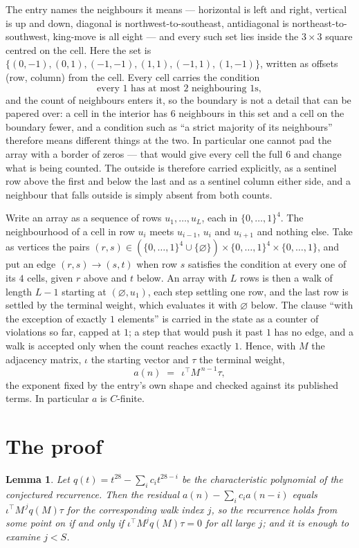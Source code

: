 \documentclass[11pt,a4paper]{article}
\theoremstyle{plain}
\newtheorem{lemma}[theorem]{Lemma}
\theoremstyle{definition}
\begin{document}
The entry names the neighbours it means --- horizontal is left and right, vertical is up and
down, diagonal is northwest-to-southeast, antidiagonal is northeast-to-southwest, king-move is
all eight --- and every such set lies inside the $3\times3$ square centred on the cell. Here
the set is $\{(0,-1), (0,1), (-1,-1), (1,1), (-1,1), (1,-1)\}$, written as offsets (row, column) from the cell. Every cell carries
the condition
\[
\text{every 1 has at most 2 neighbouring 1s},
\]
and the count of neighbours enters it, so the boundary is not a detail that can be papered
over: a cell in the interior has $6$ neighbours in this set and a cell on the boundary
fewer, and a condition such as ``a strict majority of its neighbours'' therefore means
different things at the two. In particular one cannot pad the array with a border of zeros ---
that would give every cell the full $6$ and change what is being counted. The outside is
therefore carried
explicitly, as a sentinel row above the first and below the last and as a sentinel column
either side, and a neighbour that falls outside is simply absent from both counts.

Write an array as a sequence of rows $u_1,\dots,u_L$, each in
$\{0,\dots,1\}^{4}$. The neighbourhood of a cell in row $u_i$ meets $u_{i-1}$,
$u_i$ and $u_{i+1}$ and nothing else. Take as vertices the pairs
$(r,s)\in(\{0,\dots,1\}^{4}\cup\{\varnothing\})\times\{0,\dots,1\}^{4} \times \{0,\dots,1\}$,
and put an edge $(r,s)\to(s,t)$ when row $s$ satisfies the condition at every one of its
$4$ cells, given $r$ above and $t$ below. An array with $L$ rows is then a walk of length
$L-1$ starting at $(\varnothing,u_1)$, each step settling one row, and the last row is
settled by the terminal weight, which evaluates it with $\varnothing$ below. The clause ``with the exception of exactly $1$ elements'' is carried in
the state as a counter of violations so far, capped at $1$; a step that would push it past
$1$ has no edge, and a walk is accepted only when the count reaches exactly $1$. Hence,
with $M$ the adjacency matrix, $\iota$ the starting vector and $\tau$ the terminal weight,
\[
a(n)\;=\;\,\iota^{\!\top}M^{\,n-1}\tau ,
\]
the exponent fixed by the entry's own shape and checked against its published terms. In
particular $a$ is $C$-finite.

\section{The proof}

\begin{lemma}\label{lem:crit}
Let $q(t)=t^{28}-\sum_i c_it^{28-i}$ be the characteristic polynomial of the
conjectured recurrence. Then the residual $a(n)-\sum_ic_ia(n-i)$ equals
$\iota^{\!\top}M^{\,j}q(M)\tau$ for the corresponding walk index $j$, so the
recurrence holds from some point on if and only if $\iota^{\!\top}M^{j}q(M)\tau=0$ for all
large $j$; and it is enough to examine $j<S$.
\end{lemma}
\end{document}

